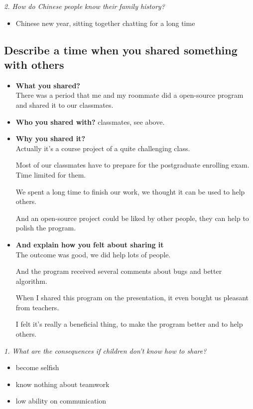 \documentclass[conference]{IEEEtran}
\begin{document}
\textit{2. How do Chinese people know their family history?}
\begin{itemize}
    \item Chinese new year, sitting together chatting for a long time
\end{itemize}

\subsection{Describe a time when you shared something with others}
\begin{itemize}
    \item \textbf{What you shared?}\\
    There was a period that me and my roommate did a open-source program and shared it to our classmates.
    \item \textbf{Who you shared with?}
    classmates, see above.
    \item \textbf{Why you shared it?}\\
    Actually it's a course project of a quite challenging class.

    Most of our classmates have to prepare for the postgraduate enrolling exam.
    Time limited for them.

    We spent a long time to finish our work, we thought it can be used to help others.

    And an open-source project could be liked by other people, they can help to polish the program.
    \item \textbf{And explain how you felt about sharing it}\\
    The outcome was good, we did help lots of people.

    And the program received several comments about bugs and better algorithm.

    When I shared this program on the presentation, it even bought us pleasant from teachers.

    I felt it's really a beneficial thing, to make the program better and to help others.
\end{itemize}

\textit{1. What are the consequences if children don't know how to share?}
\begin{itemize}
    \item become selfish
    \item know nothing about teamwork
    \item low ability on communication
\end{itemize}
\end{document}

